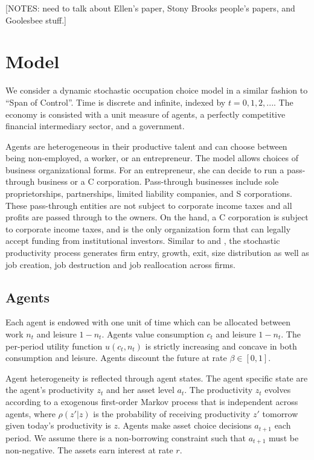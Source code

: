 \documentclass[12pt]{article}
\begin{document}
[NOTES: need to talk about Ellen's paper, Stony Brooks people's papers, and Goolesbee stuff.]

\section{Model}\label{sec:model}

We consider a dynamic stochastic occupation choice model in a similar
fashion to \citet{LucasSpan} ``Span of Control''. Time is discrete and infinite, indexed by $t=0,1,2,...$. The economy is
consisted with a unit measure of agents, a perfectly competitive financial
intermediary sector, and a government. 

Agents are heterogeneous
in their productive talent and can choose between being non-employed, a
worker, or an entrepreneur. The model allows choices of
business organizational forms. For an entrepreneur, she can decide to run a pass-through
business or a C corporation. Pass-through businesses include sole proprietorships, partnerships, limited liability companies, and S corporations. These pass-through entities are not subject to corporate income taxes and all profits are passed through to the owners. On the hand, a C corporation is subject to corporate income taxes, and is the only organization form that can legally accept funding from institutional investors. Similar to \citet{Hopenhayn1992} and 
\citet{Hopenhayn1993}, the stochastic productivity process generates firm
entry, growth, exit, size distribution as well as job creation, job
destruction and job reallocation across firms.



\subsection{Agents}

Each agent is endowed with one unit of time which can be allocated between
work $n_t$ and leisure $1-n_t$. Agents value consumption $c_t$ and leisure $%
1-n_t$. The per-period utility function $u(c_t, n_t)$ is strictly increasing
and concave in both consumption and leisure. Agents discount the future at
rate $\beta\in[0,1]$.

Agent heterogeneity is reflected through agent states. The agent specific
state are the agent's productivity $z_t$ and her asset level $a_t$. The productivity $z_t$ evolves according to a exogenous
first-order Markov process that is independent across
agents, where $\rho(z'|z)$ is the probability of receiving productivity $z'$ tomorrow given today's productivity is $z$. 
Agents make asset choice decisions $a_{t+1}$ each period. We assume there is a non-borrowing constraint such that $a_{t+1}$ must be non-negative. The assets earn interest at rate $r$.
\end{document}
